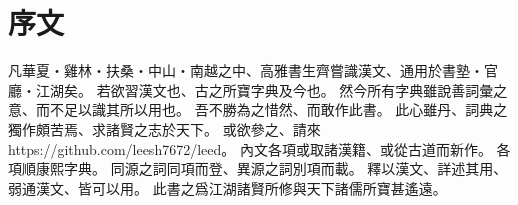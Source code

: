 \chapter*{序文}
凡華夏・雞林・扶桑・中山・南越之中、高雅書生齊嘗識漢文、通用於書塾・官廳・江湖矣。
若欲習漢文也、古之所寶字典及今也。
然今所有字典雖說善詞彙之意、而不足以識其所以用也。
吾不勝為之惜然、而敢作此書。
此心雖丹、詞典之獨作頗苦焉、求諸賢之志於天下。
或欲參之、請來 https://github.com/leesh7672/leed。
內文各項或取諸漢籍、或從古道而新作。
各項順康熙字典。
同源之詞同項而登、異源之詞別項而載。
釋以漢文、詳述其用、弱通漢文、皆可以用。
此書之爲江湖諸賢所修與天下諸儒所寶甚遙遠。
